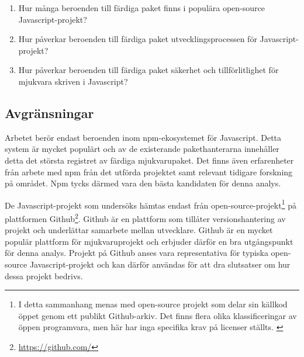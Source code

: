 \begin{enumerate}
  \item\label{joel_o-fs:1} Hur många beroenden till färdiga paket finns i populära open-source Javascript-projekt?

  \item\label{joel_o-fs:2} Hur påverkar beroenden till färdiga paket utvecklingsprocessen för Javascript-projekt?

  \item\label{joel_o-fs:3} Hur påverkar beroenden till färdiga paket säkerhet och tillförlitlighet för mjukvara skriven i Javascript?
\end{enumerate}

\subsection{Avgränsningar}
\label{subsec:joel_o-delimitations}
Arbetet berör endast beroenden inom npm-ekosystemet för Javascript. Detta system är mycket populärt och av de existerande pakethanterarna innehåller detta det största registret av färdiga mjukvarupaket.\cite{Decan2018} Det finns även erfarenheter från arbete med npm från det utförda projektet samt relevant tidigare forskning på området. Npm tycks därmed vara den bästa kandidaten för denna analys.

De Javascript-projekt som undersöks hämtas endast från open-source-projekt\footnote{I detta sammanhang menas med open-source projekt som delar sin källkod öppet genom ett publikt Github-arkiv. Det finns flera olika klassificeringar av öppen programvara, men här har inga specifika krav på licenser ställts. \cite{what-is-open-source}} på plattformen Github\footnote{\url{https://github.com/}}. Github är en plattform som tillåter versionshantering av projekt och underlättar samarbete mellan utvecklare. Github är en mycket populär plattform för mjukvaruprojekt och erbjuder därför en bra utgångspunkt för denna analys. Projekt på Github anses vara representativa för typiska open-source Javascript-projekt och kan därför användas för att dra slutsatser om hur dessa projekt bedrivs.
